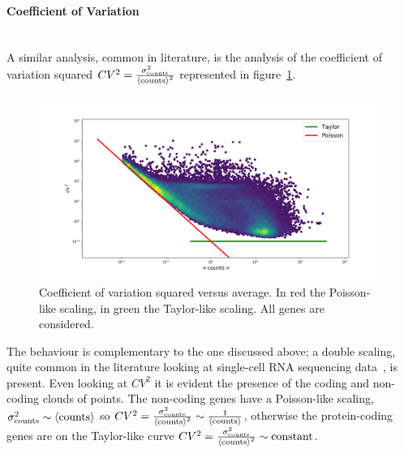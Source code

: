 \paragraph{Coefficient of Variation}\mbox{}\\
A similar analysis, common in literature, is the analysis of the coefficient of variation squared $CV^2=\frac{\sigma^2_{\mathrm{counts}}}{\left\langle \mathrm{counts}\right\rangle^2}$ represented in figure~\ref{fig:scalinglaws/gtex/allgenes/cvmean_loglog}.
\begin{figure}[htb!]
    \centering
    \includegraphics[width=0.95\linewidth]{pictures/scalinglaws/gtex/allgenes/cvmean_loglog.png}
    \caption{Coefficient of variation squared versus average. In \textcolor{pythonred}{red} the Poisson-like scaling, in \textcolor{pythongreen}{green} the Taylor-like scaling. All genes are considered.}
    \label{fig:scalinglaws/gtex/allgenes/cvmean_loglog}
\end{figure}
The behaviour is complementary to the one discussed above; a double scaling, quite common in the literature looking at single-cell RNA sequencing data~\cite{Islam2013}, is present. Even looking at $CV^2$ it is evident the presence of the coding and non-coding clouds of points. The non-coding genes have a Poisson-like scaling, $\sigma^2_{\mathrm{counts}} \sim \left\langle \mathrm{counts}\right\rangle$ so $CV^2=\frac{\sigma^2_{\mathrm{counts}}}{\left\langle \mathrm{counts}\right\rangle^2}\sim\frac{1}{\left\langle \mathrm{counts}\right\rangle}$, otherwise the protein-coding genes are on the Taylor-like curve $CV^2=\frac{\sigma^2_{\mathrm{counts}}}{\left\langle \mathrm{counts}\right\rangle^2}\sim \text{constant}$.

